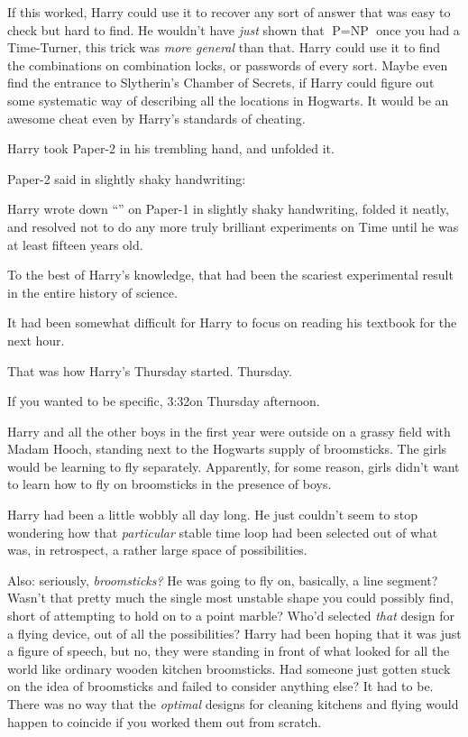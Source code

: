 If this worked, Harry could use it to recover any sort of answer that was easy to check but hard to find. He wouldn’t have \emph{just} shown that $\mbox{P}=\mbox{NP}$ once you had a Time-Turner, this trick was \emph{more general} than that. Harry could use it to find the combinations on combination locks, or passwords of every sort. Maybe even find the entrance to Slytherin’s Chamber of Secrets, if Harry could figure out some systematic way of describing all the locations in Hogwarts. It would be an awesome cheat even by Harry’s standards of cheating.

Harry took Paper-2 in his trembling hand, and unfolded it.

Paper-2 said in slightly shaky handwriting:


Harry wrote down “” on Paper-1 in slightly shaky handwriting, folded it neatly, and resolved not to do any more truly brilliant experiments on Time until he was at least fifteen years old.

To the best of Harry’s knowledge, that had been the scariest experimental result in the entire history of science.

It had been somewhat difficult for Harry to focus on reading his textbook for the next hour.

That was how Harry’s Thursday started.
\sbreak
Thursday.

If you wanted to be specific, 3:32\PM on Thursday afternoon.

Harry and all the other boys in the first year were outside on a grassy field with Madam Hooch, standing next to the Hogwarts supply of broomsticks. The girls would be learning to fly separately. Apparently, for some reason, girls didn’t want to learn how to fly on broomsticks in the presence of boys.

Harry had been a little wobbly all day long. He just couldn’t seem to stop wondering how that \emph{particular} stable time loop had been selected out of what was, in retrospect, a rather large space of possibilities.

Also: seriously, \emph{broomsticks?} He was going to fly on, basically, a line segment? Wasn’t that pretty much the single most unstable shape you could possibly find, short of attempting to hold on to a point marble? Who’d selected \emph{that} design for a flying device, out of all the possibilities? Harry had been hoping that it was just a figure of speech, but no, they were standing in front of what looked for all the world like ordinary wooden kitchen broomsticks. Had someone just gotten stuck on the idea of broomsticks and failed to consider anything else? It had to be. There was no way that the \emph{optimal} designs for cleaning kitchens and flying would happen to coincide if you worked them out from scratch.

